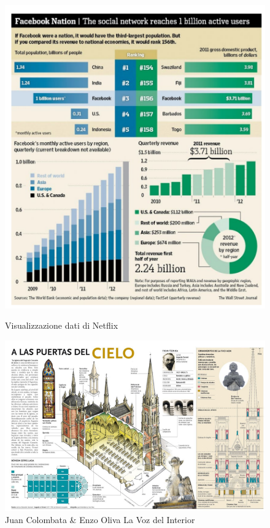 \begin{figure}[htbp]
    \centering
    \begin{minipage}{0.45\textwidth}
        \centering
        \includegraphics[width=\linewidth]{images/EsempioDV1.png} 
        \caption{Visualizzazione dati di Netflix}
        \label{fig:immagine1}
    \end{minipage}\hfill
    \begin{minipage}{0.45\textwidth}
        \centering
        \includegraphics[width=\linewidth]{images/EsempioDV2.png} %
        \caption{Juan Colombata \& Enzo Oliva  La Voz del Interior}
        \label{fig:immagine2}
    \end{minipage}
\end{figure}

